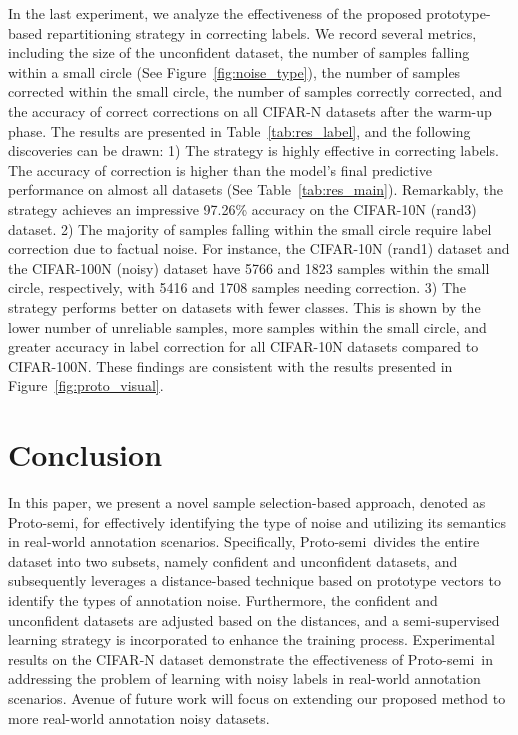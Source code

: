 \documentclass[letterpaper]{article} %
\newcommand{\method}{Proto-semi}
\begin{document}
In the last experiment, we analyze the effectiveness of the proposed prototype-based repartitioning strategy in correcting labels.
We record several metrics, including the size of the unconfident dataset, the number of samples falling within a small circle (See Figure~\ref{fig:noise_type}), the number of samples corrected within the small circle, the number of samples correctly corrected, and the accuracy of correct corrections on all CIFAR-N datasets after the warm-up phase. The results are presented in Table~\ref{tab:res_label}, and the following discoveries can be drawn: 1) The strategy is highly effective in correcting labels. The accuracy of correction is higher than the model's final predictive performance on almost all datasets (See Table~\ref{tab:res_main}). Remarkably, the strategy achieves an impressive 97.26\% accuracy on the CIFAR-10N (rand3) dataset. 2) The majority of samples falling within the small circle require label correction due to factual noise. For instance, the CIFAR-10N (rand1) dataset and the CIFAR-100N (noisy) dataset have 5766 and 1823 samples within the small circle, respectively, with 5416 and 1708 samples needing correction. 3) The strategy performs better on datasets with fewer classes. This is shown by the lower number of unreliable samples, more samples within the small circle, and greater accuracy in label correction for all CIFAR-10N datasets compared to CIFAR-100N. These findings are consistent with the results presented in Figure~\ref{fig:proto_visual}.

\section{Conclusion}
In this paper, we present a novel sample selection-based approach, denoted as \method, for effectively identifying the type of noise and utilizing its semantics in real-world annotation scenarios. Specifically, \method\ divides the entire dataset into two subsets, namely confident and unconfident datasets, and subsequently leverages a distance-based technique based on prototype vectors to identify the types of annotation noise. Furthermore, the confident and unconfident datasets are adjusted based on the distances, and a semi-supervised learning strategy is incorporated to enhance the training process. Experimental results on the CIFAR-N dataset demonstrate the effectiveness of \method\ in addressing the problem of learning with noisy labels in real-world annotation scenarios. Avenue of future work will focus on extending our proposed method to more real-world annotation noisy datasets.
\end{document}
